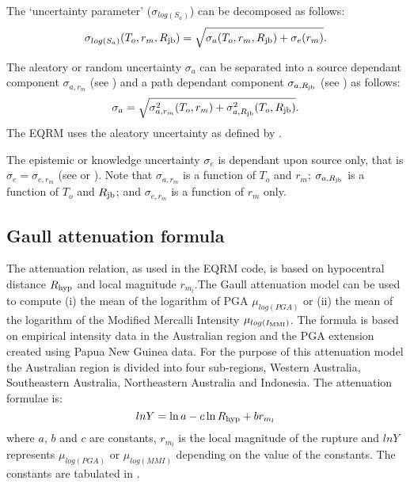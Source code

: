 The `uncertainty parameter' ($\sigma_{log(S_a)}$) can be
decomposed as follows:
\begin{equation}
 \sigma_{log(S_a)}(T_o,r_m,\Rjb) =
 \sqrt{\sigma_a(T_o,r_m,\Rjb)+\sigma_e(r_m)}.
\end{equation}

The aleatory or random uncertainty $\sigma_a$ can be separated
into a source dependant component $\sigma_{a,r_m}$ (see
\citet[Table 3]{dr_Toro97a}) and a path dependant
component $\sigma_{a,\Rjb}$ (see \citet[Table 4]{dr_Toro97a}) as follows:
\begin{equation}
\label{eq:attn-toro-aleat} \sigma_a =
\sqrt{\sigma_{a,r_m}^2(T_o,r_m) + \sigma_{a,\Rjb}^2(T_o,\Rjb)}.
\end{equation}
The EQRM uses the aleatory uncertainty as defined by
.

The epistemic or knowledge uncertainty $\sigma_e$ is dependant
upon source only, that is \mbox{$\sigma_e =\sigma_{e,r_m}$} (see
\citet[Page 48]{dr_Toro97a} or
). Note that
$\sigma_{a,r_m}$ is a function of $T_o$ and $r_m$;
$\sigma_{a,\Rjb}$ is a function of $T_o$ and $\Rjb$; and
$\sigma_{e,r_m}$ is a function of $r_m$ only.

\subsection{Gaull attenuation formula}
\label{attn:atten-formula-Gaull}


The \citet{dr_Gaull90a} attenuation relation, as used in the EQRM
code, is based on hypocentral distance $\Rhyp$ and local magnitude
$r_{m_l}$.The Gaull attenuation model can be used to compute (i)
the mean of the logarithm of PGA $\mu_{log(PGA)}$ or (ii) the mean
of the logarithm of the Modified Mercalli Intensity
$\mu_{log(\Imm)}$. The formula is based on empirical intensity
data in the Australian region and the PGA extension created using
Papua New Guinea data. For the purpose of this attenuation model
the Australian region is divided into four sub-regions, Western
Australia, Southeastern Australia, Northeastern Australia and
Indonesia. The attenuation formulae is:
\begin{equation}
lnY = \ln a-c\ln \Rhyp + br_{m_l}
\end{equation}
where $a$, $b$ and $c$ are constants, $r_{m_l}$ is the local
magnitude of the rupture and $lnY$ represents $\mu_{log(PGA)}$ or
$\mu_{log(MMI)}$ depending on the value of the constants. The
constants are tabulated in \citet[Table 4]{dr_Gaull90a}.

